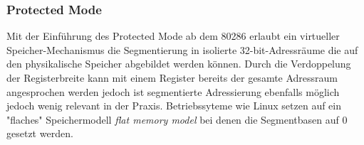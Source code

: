 \subsubsection{Protected Mode}

Mit der Einführung des Protected Mode ab dem 80286 erlaubt ein virtueller Speicher-Mechanismus die Segmentierung in isolierte 32-bit-Adressräume die auf den physikalische Speicher abgebildet werden können. Durch die Verdoppelung der Registerbreite kann mit einem Register bereits der gesamte Adressraum angesprochen werden jedoch ist segmentierte Adressierung ebenfalls möglich jedoch wenig relevant  in der Praxis. Betriebssyteme wie Linux setzen auf ein "flaches" Speichermodell \emph{flat memory model} bei denen die Segmentbasen auf 0 gesetzt werden.





